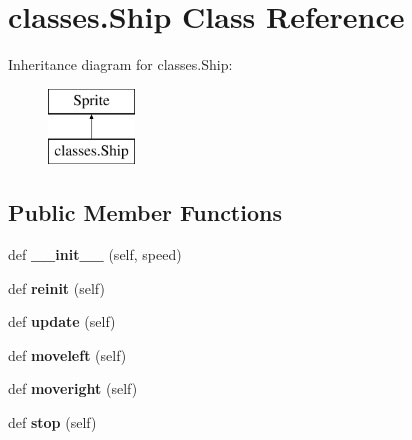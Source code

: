\hypertarget{classclasses_1_1_ship}{}\section{classes.\+Ship Class Reference}
\label{classclasses_1_1_ship}
Inheritance diagram for classes.\+Ship\+:\begin{figure}[H]
\begin{center}
\leavevmode
\includegraphics[height=2.000000cm]{classclasses_1_1_ship}
\end{center}
\end{figure}
\subsection*{Public Member Functions}
\begin{DoxyCompactItemize}
\item 
\hypertarget{classclasses_1_1_ship_adf2eb54de7bb8df098cf6c4134a6d186}{}def {\bfseries \+\_\+\+\_\+init\+\_\+\+\_\+} (self, speed)\label{classclasses_1_1_ship_adf2eb54de7bb8df098cf6c4134a6d186}

\item 
\hypertarget{classclasses_1_1_ship_ac1a587b0beba11d416d58758335ae223}{}def {\bfseries reinit} (self)\label{classclasses_1_1_ship_ac1a587b0beba11d416d58758335ae223}

\item 
\hypertarget{classclasses_1_1_ship_a82f0d397e08683e8fc166381ccf37844}{}def {\bfseries update} (self)\label{classclasses_1_1_ship_a82f0d397e08683e8fc166381ccf37844}

\item 
\hypertarget{classclasses_1_1_ship_a70a990236bce1668a4934ddedd6bec53}{}def {\bfseries moveleft} (self)\label{classclasses_1_1_ship_a70a990236bce1668a4934ddedd6bec53}

\item 
\hypertarget{classclasses_1_1_ship_a5986dca8d7637d2aafd4db4251e7b837}{}def {\bfseries moveright} (self)\label{classclasses_1_1_ship_a5986dca8d7637d2aafd4db4251e7b837}

\item 
\hypertarget{classclasses_1_1_ship_a8ccdbfec96ec67ff27ef2afa6e30bab3}{}def {\bfseries stop} (self)\label{classclasses_1_1_ship_a8ccdbfec96ec67ff27ef2afa6e30bab3}

\end{DoxyCompactItemize}
